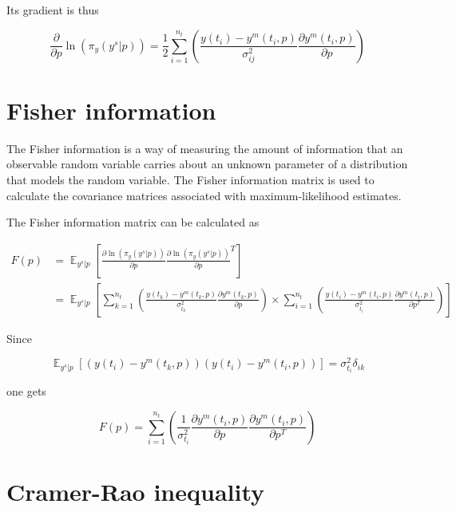 \documentclass[]{scrartcl}
\begin{document}
Its gradient is thus

\begin{equation}
	\frac{\partial}{\partial p} \ln (\pi_y (y^s|p)) =  \frac{1}{2} \sum_{i=1}^{n_t}  \left( \frac{y(t_i) - y^m(t_i, p)}{\sigma_{ij}^2} \frac{\partial y^m(t_i, p)}{\partial p} \right)
\end{equation}

\section{Fisher information}

The Fisher information is a way of measuring the amount of information that an observable random variable carries about an unknown parameter of a distribution that models the random variable. The Fisher information matrix is used to calculate the covariance matrices associated with maximum-likelihood estimates.

The Fisher information matrix can be calculated as

\begin{align}
	F(p) &= \mathop{\mathbb{E}}_{y^s|p} \left[ \frac{\partial \ln (\pi_y (y^s|p))}{\partial p} \frac{\partial \ln (\pi_y (y^s|p))}{\partial p}^T \right] \\
	&= \mathop{\mathbb{E}}_{y^s|p} \left[ \sum_{k=1}^{n_t} \left( \frac{y(t_k) - y^m(t_k, p)}{\sigma_{t_k}^2} \frac{\partial y^m(t_k, p)}{\partial p} \right) \times  \sum_{i=1}^{n_t} \left( \frac{y(t_i) - y^m(t_i, p)}{\sigma_{t_i}^2} \frac{\partial y^m(t_i, p)}{\partial p^T} \right) \right]
\end{align}

Since

\begin{equation}
	\mathop{\mathbb{E}}_{y^s|p} \left[ \left( y(t_i) - y^m(t_k, p) \right) \left( y(t_i) - y^m(t_i, p) \right) \right] = \sigma_{t_i}^2 \delta_{ik}
\end{equation}

one gets

\begin{equation}
	F(p) = \sum_{i=1}^{n_t} \left( \frac{1}{\sigma_{t_i}^2} \frac{\partial y^m(t_i, p)}{\partial p} \frac{\partial y^m(t_i, p)}{\partial p^T} \right)
\end{equation}

\section{Cramer-Rao inequality}
\end{document}
